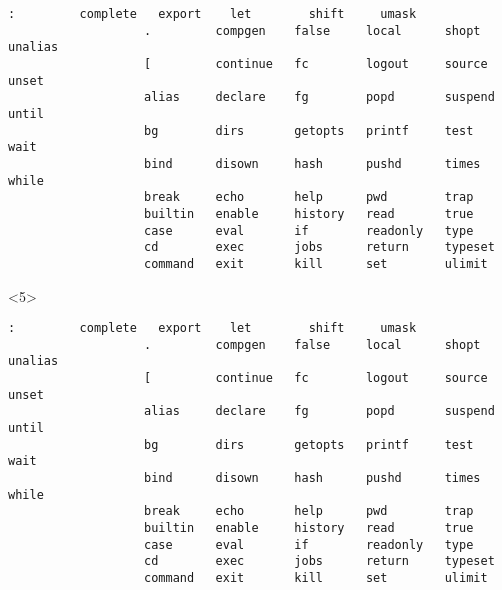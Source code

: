 \begin{frame}
\begin{overlayarea}{\textwidth}{0.7\textheight}
\begin{onlyenv}
\begin{onlyenv}
\begin{lstlisting}[style=MyBash, numbers=none, keywordstyle=\color{builtins-color},]
                   :         complete   export    let        shift     umask  
                   .         compgen    false     local      shopt     unalias
                   [         continue   fc        logout     source    unset  
                   alias     declare    fg        popd       suspend   until  
                   bg        dirs       getopts   printf     test      wait   
                   bind      disown     hash      pushd      times     while  
                   break     echo       help      pwd        trap      
                   builtin   enable     history   read       true      
                   case      eval       if        readonly   type      
                   cd        exec       jobs      return     typeset   
                   command   exit       kill      set        ulimit    
                \end{lstlisting}
            \end{onlyenv}
            \begin{onlyenv}<5>
                \begin{lstlisting}[style=MyBash, numbers=none, deleteemph={[5]:,.,[,alias, bg, break, case, cd, continue, declare, disown, echo, eval, exec, exit, export, false, fg, help, if, jobs, kill, let, local,printf, pwd, read, readonly, return, set, shift, shopt, source, test, trap, true, unalias, unset, until, wait, while}, emph={[7]:,.,[,alias, bg, break, case, cd, continue, declare, disown, echo, eval, exec, exit, export,false, fg, help, if, jobs, kill, let, local,printf, pwd, read, readonly, return, set, shift, shopt, source, test, trap, true, unalias, unset, until, wait, while}, emphstyle={[7]\color{PP}}]
                   :         complete   export    let        shift     umask  
                   .         compgen    false     local      shopt     unalias
                   [         continue   fc        logout     source    unset  
                   alias     declare    fg        popd       suspend   until  
                   bg        dirs       getopts   printf     test      wait   
                   bind      disown     hash      pushd      times     while  
                   break     echo       help      pwd        trap      
                   builtin   enable     history   read       true      
                   case      eval       if        readonly   type      
                   cd        exec       jobs      return     typeset   
                   command   exit       kill      set        ulimit    
                \end{lstlisting}

\end{onlyenv}
\end{onlyenv}
\end{overlayarea}
\end{frame}
